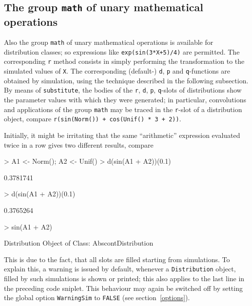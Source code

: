 \documentclass[11pt]{article}
\newcommand{\code}[1]{{\tt #1}}
\begin{document}
\subsection[The group math of unary mathematical operations]{The group 
\code{math} of unary mathematical operations}
%
Also the group \code{math} of unary mathematical operations is available for
distribution classes; so
expressions like \code{exp(sin(3*X+5)/4)} are permitted.
%
 The corresponding \code{r} method consists in simply
performing the transformation to the simulated values of \code{X}.
The corresponding (default-) \code{d}, \code{p} and \code{q}-functions are 
obtained by simulation, using the technique described in the following 
subsection.\\
By means of \code{substitute}, the bodies of the \code{r}, \code{d}, 
\code{p}, \code{q}-slots of distributions show the parameter values with 
which they were generated; in particular,
convolutions and applications of the group \code{math} may be traced in
the \code{r}-slot of a distribution object, compare\newline
\code{r(sin(Norm()) + cos(Unif() * 3 + 2))}.

Initially, it might be irritating that the same ``arithmetic'' expression
evaluated twice in a row gives two different results, compare
\begin{Schunk}
\begin{Sinput}
>   A1 <- Norm(); A2 <- Unif()
>   d(sin(A1 + A2))(0.1)
\end{Sinput}
\begin{Soutput}
[1] 0.3781741
\end{Soutput}
\begin{Sinput}
>   d(sin(A1 + A2))(0.1)
\end{Sinput}
\begin{Soutput}
[1] 0.3765264
\end{Soutput}
\begin{Sinput}
>   sin(A1 + A2)
\end{Sinput}
\begin{Soutput}
Distribution Object of Class: AbscontDistribution
\end{Soutput}
\end{Schunk}
This is due to the fact, that all slots are filled starting from simulations.
To explain this, a warning is issued  by default, whenever a \code{Distribution}
object, filled by such simulations is shown or printed; this also applies to the 
last line in the preceding code sniplet. This behaviour may again be switched 
off by setting the global option
\code{WarningSim} to \code{FALSE} (see section~\ref{options}).\\
\end{document}
